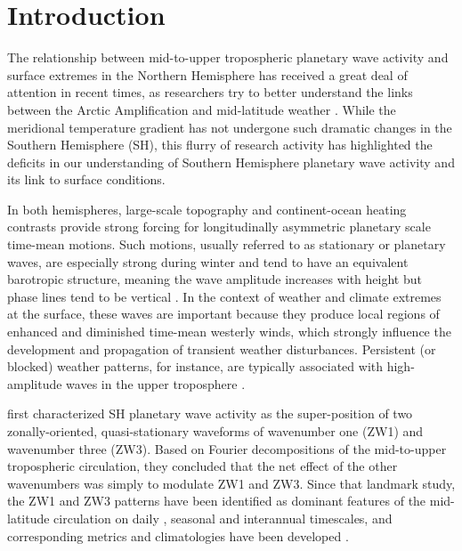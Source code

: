 \section{Introduction}\label{s:introduction}

The relationship between mid-to-upper tropospheric planetary wave activity and surface extremes in the Northern Hemisphere has received a great deal of attention in recent times, as researchers try to better understand the links between the Arctic Amplification and mid-latitude weather \citep[e.g.][]{Cohen2014,Screen2014}. While the meridional temperature gradient has not undergone such dramatic changes in the Southern Hemisphere (SH), this flurry of research activity has highlighted the deficits in our understanding of Southern Hemisphere planetary wave activity and its link to surface conditions. 

In both hemispheres, large-scale topography and continent-ocean heating contrasts provide strong forcing for longitudinally asymmetric planetary scale time-mean motions. Such motions, usually referred to as stationary or planetary waves, are especially strong during winter and tend to have an equivalent barotropic structure, meaning the wave amplitude increases with height but phase lines tend to be vertical \citep{Holton2013}. In the context of weather and climate extremes at the surface, these waves are important because they produce local regions of enhanced and diminished time-mean westerly winds, which strongly influence the development and propagation of transient weather disturbances. Persistent (or blocked) weather patterns, for instance, are typically associated with high-amplitude waves in the upper troposphere \citep[e.g.][]{Trenberth1985,Renwick2005}.

\citet{vanLoon1972} first characterized SH planetary wave activity as the super-position of two zonally-oriented, quasi-stationary waveforms of wavenumber one (ZW1) and wavenumber three (ZW3). Based on Fourier decompositions of the mid-to-upper tropospheric circulation, they concluded that the net effect of the other wavenumbers was simply to modulate ZW1 and ZW3. Since that landmark study, the ZW1 and ZW3 patterns have been identified as dominant features of the mid-latitude circulation on daily \citep[e.g.][]{Kidson1988}, seasonal \citep[e.g.][]{Mo1985} and interannual \citep[e.g.][]{Karoly1989} timescales, and corresponding metrics and climatologies have been developed \citep{Raphael2004,Hobbs2007}.

